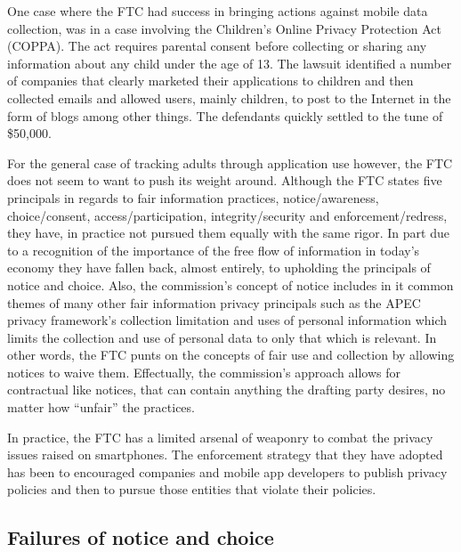 One case where the FTC had success in bringing actions against mobile data collection, was in a case involving the Children's Online Privacy Protection Act (COPPA). The act requires parental consent before collecting or sharing any information about any child under the age of 13. The lawsuit identified a number of companies that clearly marketed their applications to children and then collected emails and allowed users, mainly children, to post to the Internet in the form of blogs among other things\cite{ftc2011}. The defendants quickly settled to the tune of \$50,000. 



For the general case of tracking adults through application use however, the FTC does not seem to want to push its weight around. 
Although the FTC states five principals in regards to fair information practices, notice/awareness, choice/consent, access/participation, integrity/security and enforcement/redress, they have, in practice not pursued them equally with the same rigor.
In part due to a recognition of the importance of the free flow of information in today's economy\cite{privacy-online} they have fallen back, almost entirely, to upholding the principals of notice and choice. 
Also, the commission's concept of notice includes in it common themes of many other fair information privacy principals such as the APEC privacy framework's collection limitation and uses of personal information which limits the collection and use of personal data to only that which is relevant\cite{fair}. 
In other words, the FTC punts on the concepts of fair use and collection by allowing notices to waive them. 
Effectually, the commission's approach allows for contractual like notices, that can contain anything the drafting party desires, no matter how ``unfair'' the practices\cite{fair}. 

In practice, the FTC 
has a limited arsenal of weaponry to combat the privacy issues raised on smartphones. The enforcement strategy that they have adopted has been to 
encouraged companies and mobile app developers to publish privacy policies
and then to pursue those entities that violate their policies. 

	\subsection{Failures of notice and choice}

